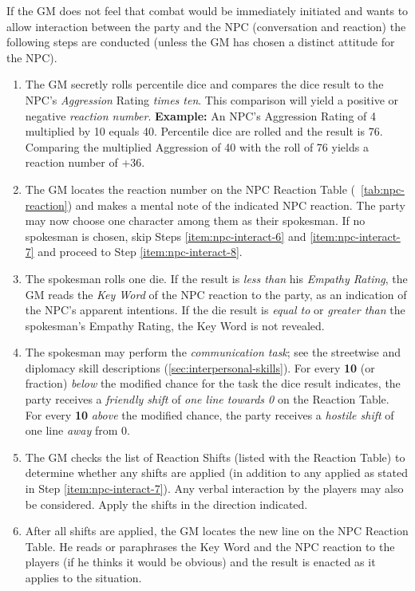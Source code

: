 If the GM does not feel that combat would be immediately initiated and
wants to allow interaction between the party and the NPC (conversation
and reaction) the following steps are conducted (unless the GM has
chosen a distinct attitude for the NPC).

\begin{enumerate}
\item The GM secretly rolls percentile dice and compares the dice
  result to the NPC's \emph{Aggression} Rating \emph{times ten}. This
  comparison will yield a positive or negative \emph{reaction number}.
  \textbf{Example:} An NPC's Aggression Rating of 4 multiplied by 10
  equals 40. Percentile dice are rolled and the result is 76.
  Comparing the multiplied Aggression of 40 with the roll of 76 yields
  a reaction number of +36.
\item The GM locates the reaction number on the NPC Reaction Table
  (~\ref{tab:npc-reaction}) and makes a mental note of the indicated NPC
  reaction.  The party may now choose one character among them as
  their spokesman. If no spokesman is chosen, skip Steps \ref{item:npc-interact-6}
  and \ref{item:npc-interact-7} and proceed to Step \ref{item:npc-interact-8}.
\item The spokesman rolls one die. If the result is \emph{less than}
  his \emph{Empathy Rating}, the GM reads the \emph{Key Word} of the
  NPC reaction to the party, as an indication of the NPC's apparent
  intentions. If the die result is \emph{equal to} or \emph{greater
    than} the spokesman's Empathy Rating, the Key Word is not
  revealed.\label{item:npc-interact-6}
\item The spokesman may perform the \emph{communication task}; see the
  streetwise and diplomacy skill descriptions
  (\ref{sec:interpersonal-skills}). For every \textbf{10} (or
  fraction) \emph{below} the modified chance for the task the dice
  result indicates, the party receives a \emph{friendly shift} of
  \emph{one line towards 0} on the Reaction Table. For every
  \textbf{10} \emph{above} the modified chance, the party receives a
  \emph{hostile shift} of one line \emph{away} from 0.\label{item:npc-interact-7}
\item The GM checks the list of Reaction Shifts (listed with the
  Reaction Table) to determine whether any shifts are applied (in
  addition to any applied as stated in Step \ref{item:npc-interact-7}). Any verbal
  interaction by the players may also be considered. Apply the shifts
  in the direction indicated.\label{item:npc-interact-8}
\item After all shifts are applied, the GM locates the new line on the
  NPC Reaction Table. He reads or paraphrases the Key Word and the NPC
  reaction to the players (if he thinks it would be obvious) and the
  result is enacted as it applies to the situation.
\end{enumerate}



